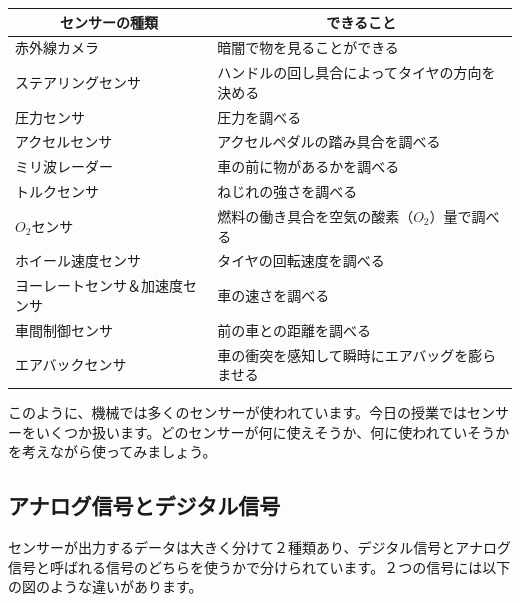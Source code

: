 \begin{table}[htb]
  \centering
  \begin{tabular}{|l|l|} \hline
\multicolumn{1}{|c|}{センサーの種類} & \multicolumn{1}{c|}{できること} \\ \hline\hline
赤外線カメラ & 暗闇で物を見ることができる \\
ステアリングセンサ & ハンドルの回し具合によってタイヤの方向を決める \\
圧力センサ & 圧力を調べる \\
アクセルセンサ & アクセルペダルの踏み具合を調べる \\
ミリ波レーダー & 車の前に物があるかを調べる \\
トルクセンサ & ねじれの強さを調べる \\
$O_2$センサ & 燃料の働き具合を空気の酸素（$O_2$）量で調べる \\
ホイール速度センサ & タイヤの回転速度を調べる \\
ヨーレートセンサ＆加速度センサ & 車の速さを調べる \\
車間制御センサ & 前の車との距離を調べる \\
エアバックセンサ & 車の衝突を感知して瞬時にエアバッグを膨らませる \\ \hline
  \end{tabular}
\end{table}

このように、機械では多くのセンサーが使われています。今日の授業ではセンサーをいくつか扱います。どのセンサーが何に使えそうか、何に使われていそうかを考えながら使ってみましょう。

\begin{tcolorbox}[title=\useOmetoi]
\begin{enumerate}
\end{enumerate}
\end{tcolorbox}
\begin{tcolorbox}[title=\useOmetoi]
\begin{enumerate}
\end{enumerate}
\end{tcolorbox}

\subsection{アナログ信号とデジタル信号}
センサーが出力するデータは大きく分けて２種類あり、デジタル信号とアナログ信号と呼ばれる信号のどちらを使うかで分けられています。２つの信号には以下の図のような違いがあります。

